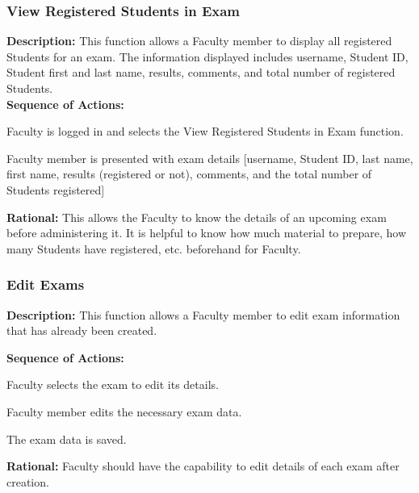    \subsubsection{\large View Registered Students in Exam} 
   \begin{boxed} %
      \textbf{Description:}
      {\small This function allows a Faculty member to display all registered
         Students for an exam. The information displayed includes username,
         Student ID, Student first and last name, results, comments, and total number
         of registered Students.} \\
         
         \textbf{Sequence of Actions:}
         \begin{enumerate}
               {\small
            \item Faculty is logged in and selects the View Registered Students
               in Exam function.
            \item Faculty member is presented with exam details [username,
               Student ID, last name, first name, results (registered or not),
               comments, and the total number of Students registered]}
         \end{enumerate}

         \textbf{Rational:}
         {\small This allows the Faculty to know the details of an upcoming exam before
         administering it. It is helpful to know how much material to prepare,
         how many Students have registered, etc. beforehand for Faculty.}
   \end{boxed} %

   \subsubsection{\large Edit Exams} 
   \begin{boxed} %
      \textbf{Description:}
      {\small This function allows a Faculty member to edit exam information
         that has already been created.}
         
         \textbf{Sequence of Actions:}
         \begin{enumerate}
               {\small
            \item Faculty selects the exam to edit its details.
            \item Faculty member edits the necessary exam data.
            \item The exam data is saved.}
         \end{enumerate}

         \textbf{Rational:}
         {\small Faculty should have the capability to edit details of each exam after
         creation.}
   \end{boxed} %

